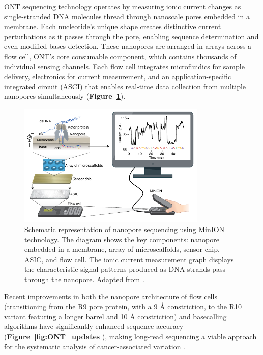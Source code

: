 ONT sequencing technology operates by measuring ionic current changes as 
single-stranded DNA molecules thread through nanoscale pores embedded in a 
membrane. Each nucleotide's unique shape creates distinctive current 
perturbations as it passes through the pore, enabling sequence determination 
and even modified bases detection. These nanopores are arranged in arrays across 
a flow cell, ONT's core consumable component, which contains thousands of 
individual sensing channels. Each flow cell integrates microfluidics for sample 
delivery, electronics for current measurement, and an application-specific 
integrated circuit (ASCI) that enables real-time data collection from multiple 
nanopores simultaneously (\textbf{Figure~\ref{fig:ont_seq}}). 

\begin{figure}[H]
    \centering
    \includegraphics[width=0.8\textwidth]{img/ont_seq.pdf}
    \caption[Principle of nanopore sequencing]{Schematic representation of 
    nanopore sequencing using MinION technology. The diagram shows the key 
    components: nanopore embedded in a membrane, array of microscaffolds, 
    sensor chip, ASIC, and flow cell. The ionic current measurement graph 
    displays the characteristic signal patterns produced as DNA strands pass 
    through the nanopore. Adapted from \cite{wang_nanopore_2021}.}
    \label{fig:ont_seq}
\end{figure}

Recent improvements in both the nanopore architecture of flow cells 
(transitioning from the R9 pore protein, with a 9 Å constriction, to the R10 
variant featuring a longer barrel and 10 Å constriction) and basecalling 
algorithms have significantly enhanced sequence accuracy 
(\textbf{Figure~\ref{fig:ONT_updates}}), making long-read sequencing a viable 
approach for the systematic analysis of cancer-associated variation
\cite{kolmogorov_scalable_2023,sakamoto_phasing_2022,schaal_migrating_2022}.

